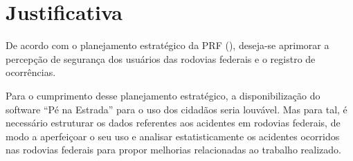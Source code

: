 \chapter[Justificativa]{Justificativa}

De acordo com o planejamento estratégico da PRF (\citeyear{prf13}), deseja-se aprimorar a
percepção de segurança dos usuários das rodovias federais e o registro de ocorrências.

Para o cumprimento desse planejamento estratégico, a disponibilização do software
“Pé na Estrada” para o uso dos cidadãos seria louvável. Mas para tal, é necessário
estruturar os dados referentes aos acidentes em rodovias federais, de modo a aperfeiçoar o
seu uso e analisar estatisticamente os acidentes ocorridos nas rodovias federais para
propor melhorias relacionadas ao trabalho realizado.